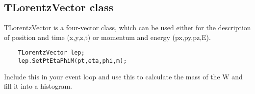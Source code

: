 \documentclass[letterpaper,12pt]{article}
\begin{document}
\subsection{TLorentzVector class}
TLorentzVector is a four-vector class, which can be used either for the description of position and time (x,y,z,t) or momentum and energy (px,py,pz,E).

\begin{lstlisting}
	TLorentzVector lep;
	lep.SetPtEtaPhiM(pt,eta,phi,m);
\end{lstlisting}

Include this in your event loop and use this to calculate the mass of the W and fill it into a histogram.
% 
% 








\end{document}
